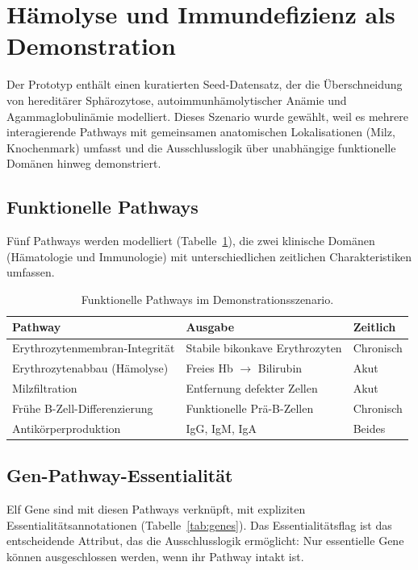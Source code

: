 \documentclass[12pt,a4paper]{article}
\begin{document}
\section{Hämolyse und Immundefizienz als Demonstration}
\label{sec:demo}

Der Prototyp enthält einen kuratierten Seed-Datensatz, der die Überschneidung von hereditärer Sphärozy\-tose, autoimmunhämolytischer Anämie und Agammaglobulinämie modelliert. Dieses Szenario wurde gewählt, weil es mehrere interagierende Pathways mit gemeinsamen anatomischen Lokalisationen (Milz, Knochenmark) umfasst und die Ausschlusslogik über unabhängige funktionelle Domänen hinweg demonstriert.

\subsection{Funktionelle Pathways}

Fünf Pathways werden modelliert (Tabelle~\ref{tab:pathways}), die zwei klinische Domänen (Hämatologie und Immunologie) mit unterschiedlichen zeitlichen Charakteristiken umfassen.

\begin{table}[H]
\centering
\caption{Funktionelle Pathways im Demonstrationsszenario.}
\label{tab:pathways}
\begin{tabular}{lll}
\toprule
\textbf{Pathway} & \textbf{Ausgabe} & \textbf{Zeitlich} \\
\midrule
Erythrozytenmembran-Integrität & Stabile bikonkave Erythrozyten & Chronisch \\
Erythrozytenabbau (Hämolyse) & Freies Hb $\to$ Bilirubin & Akut \\
Milzfiltration & Entfernung defekter Zellen & Akut \\
Frühe B-Zell-Differenzierung & Funktionelle Prä-B-Zellen & Chronisch \\
Antikörperproduktion & IgG, IgM, IgA & Beides \\
\bottomrule
\end{tabular}
\end{table}

\subsection{Gen-Pathway-Essentialität}

Elf Gene sind mit diesen Pathways verknüpft, mit expliziten Essentialitätsannotationen (Tabelle~\ref{tab:genes}). Das Essentialitätsflag ist das entscheidende Attribut, das die Ausschlusslogik ermöglicht: Nur essentielle Gene können ausgeschlossen werden, wenn ihr Pathway intakt ist.
\end{document}
